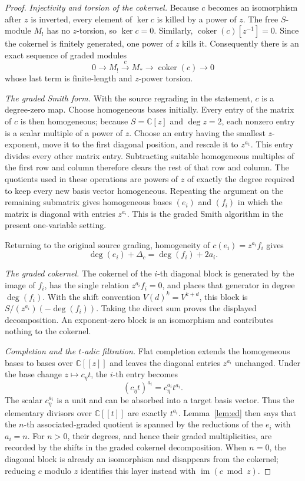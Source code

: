 \documentclass[10pt,a4paper]{amsart}
\newcommand{\C}{\mathbb C}
\newcommand{\A}{\C[[t]]}
\begin{document}
\begin{proof}
\smallskip
\noindent\emph{Injectivity and torsion of the cokernel.}
Because $c$ becomes an isomorphism after $z$ is inverted, every element of
$\ker c$ is killed by a power of $z$.  The free $S$-module $M_!$ has no
$z$-torsion, so $\ker c=0$.  Similarly,
$\operatorname{coker}(c)[z^{-1}]=0$.  Since the cokernel is finitely
generated, one power of $z$ kills it.  Consequently there is an exact sequence of
graded modules
\[
 0\longrightarrow M_!\xrightarrow{c}M_*
 \longrightarrow\operatorname{coker}(c)\longrightarrow0
\]
whose last term is finite-length and $z$-power torsion.

\smallskip
\noindent\emph{The graded Smith form.}
With the source regrading in the statement, $c$ is a degree-zero map.  Choose
homogeneous bases initially.  Every entry of the matrix of $c$ is then
homogeneous; because $S=\mathbb C[z]$ and $\deg z=2$, each nonzero entry is a
scalar multiple of a power of $z$.  Choose an entry having the smallest
$z$-exponent, move it to the first diagonal position, and rescale it to
$z^{a_1}$.  This entry divides every other matrix entry.  Subtracting suitable
homogeneous multiples of the first row and column therefore clears the rest
of that row and column.  The quotients used in these operations are powers of
$z$ of exactly the degree required to keep every new basis vector
homogeneous.  Repeating the argument on the remaining submatrix gives
homogeneous bases $(e_i)$ and $(f_i)$ in which the matrix is diagonal with
entries $z^{a_i}$.  This is the graded Smith algorithm in the present
one-variable setting.

Returning to the original source grading, homogeneity of
$c(e_i)=z^{a_i}f_i$ gives
\[
 \deg(e_i)+\Delta_c=\deg(f_i)+2a_i.
\]

\smallskip
\noindent\emph{The graded cokernel.}
The cokernel of the $i$-th diagonal block is generated by the image of
$f_i$, has the single relation $z^{a_i}f_i=0$, and places that generator in
degree $\deg(f_i)$.  With the shift convention
$V(d)^k=V^{k+d}$, this block is
$S/(z^{a_i})(-\deg(f_i))$.  Taking the direct sum proves the displayed
decomposition.  An exponent-zero block is an isomorphism and
contributes nothing to the cokernel.

\smallskip
\noindent\emph{Completion and the $t$-adic filtration.}
Flat completion extends the homogeneous bases to bases over
$\mathbb C[[z]]$ and leaves the diagonal entries $z^{a_i}$ unchanged.  Under
the base change $z\mapsto c_\eta t$, the $i$-th entry becomes
\[
 (c_\eta t)^{a_i}=c_\eta^{a_i}t^{a_i}.
\]
The scalar $c_\eta^{a_i}$ is a unit and can be absorbed into a target basis
vector.  Thus the elementary divisors over $\A$ are exactly $t^{a_i}$.
Lemma~\ref{lem:ed} then says that the $n$-th associated-graded quotient is
spanned by the reductions of the $e_i$ with $a_i=n$.  For $n>0$, their
degrees, and hence their graded multiplicities, are recorded by the shifts in
the graded cokernel decomposition.  When $n=0$, the diagonal block is already
an isomorphism and disappears from the cokernel; reducing $c$ modulo $z$
identifies this layer instead with $\operatorname{im}(c\bmod z)$.
\end{proof}
\end{document}
